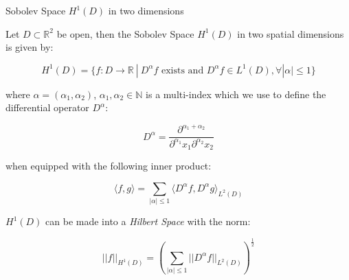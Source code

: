 \begin{definition}\label{def:twod-H1-D}
    Sobolev Space $H^1(D)$ in two dimensions

    Let $D \subset \mathbb{R}^2$ be open, then the Sobolev Space $H^1(D)$ in
    two spatial dimensions is given by:

    \begin{equation}\label{eq:twod-H1-D}
        H^1(D) = \{f: D \rightarrow \mathbb{R}\ |\
            D^\alpha f \text{ exists and } D^\alpha f \in L^1(D),
            \forall |\alpha| \leq 1 \}
    \end{equation}

    where $\alpha = (\alpha_1, \alpha_2)$, $\alpha_1, \alpha_2 \in \mathbb{N}$
    is a multi-index which we use to define the differential operator $D^\alpha$:

    \[
        D^\alpha = \frac{\partial^{\alpha_1 + \alpha_2}}
        {\partial^{\alpha_1}x_1\partial^{\alpha_2}x_2}
    \]

    when equipped with the following inner product:

    \begin{equation}\label{eq:twod-H1-D-inner-product}
        \langle f, g\rangle =
            \sum_{|\alpha| \leq 1}\langle D^\alpha f, D^\alpha g \rangle_{L^2(D)}
    \end{equation}

    $H^1(D)$ can be made into a \textit{Hilbert Space} with the norm:

    \begin{equation}\label{eq:twod-H1-D-norm}
        ||f||_{H^1(D)} =
         \left(\sum_{|\alpha| \leq 1}||D^\alpha f||_{L^2(D)}\right)^\frac{1}{2}
    \end{equation}
\end{definition}
